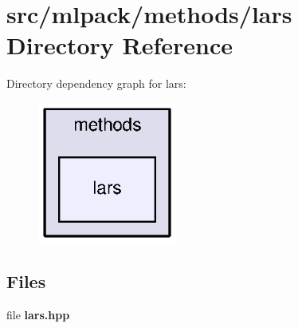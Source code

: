 \section{src/mlpack/methods/lars Directory Reference}
\label{dir_339a92b69de992c476f69912c4933ab8}
Directory dependency graph for lars\+:
\nopagebreak
\begin{figure}[H]
\begin{center}
\leavevmode
\includegraphics[width=130pt]{dir_339a92b69de992c476f69912c4933ab8_dep}
\end{center}
\end{figure}
\subsection*{Files}
\begin{DoxyCompactItemize}
\item 
file {\bf lars.\+hpp}
\end{DoxyCompactItemize}
